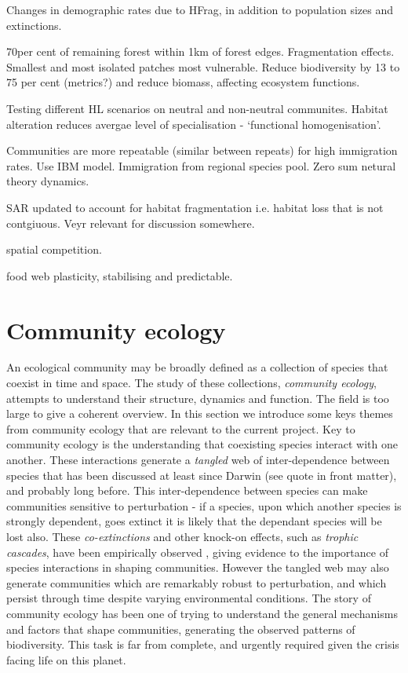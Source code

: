 \cite{korfanta2012long} Changes in demographic rates due to HFrag, in addition to population sizes and extinctions.

\cite{haddad2015habitat} 70per cent of remaining forest within 1km of forest edges. Fragmentation effects. Smallest and most isolated patches most vulnerable. Reduce biodiversity by 13 to 75 per cent (metrics?) and reduce biomass, affecting ecosystem functions. 

\cite{teyssedre2014contrasting} Testing different HL scenarios on neutral and non-neutral communites. Habitat alteration reduces avergae level of specialisation - `functional homogenisation'.

\cite{ai2012immigration} Communities are more repeatable (similar between repeats) for high immigration rates. Use IBM model. Immigration from regional species pool. Zero sum netural theory dynamics. 

\cite{hanski2013species} SAR updated to account for habitat fragmentation i.e. habitat loss that is not contgiuous. Veyr relevant for discussion somewhere.

\cite{freckleton2009measuring} spatial competition.

\cite{eveleigh2007fluctuations} food web plasticity, stabilising and predictable.
  
  
\section{Community ecology}
\label{sec:intro_community_ecology}

An ecological community may be broadly defined as a collection of species that coexist in time and space. The study of these collections, \emph{community ecology}, attempts to understand their structure, dynamics and function. The field is too large to give a coherent overview. In this section we introduce some keys themes from community ecology that are relevant to the current project. Key to community ecology is the understanding that coexisting species interact with one another. These interactions generate a \emph{tangled} web of inter-dependence between species that has been discussed at least since Darwin \cite{darwin2009origin} (see quote in front matter), and probably long before. This inter-dependence between species can make communities sensitive to perturbation - if a species, upon which another species is strongly dependent, goes extinct it is likely that the dependant species will be lost also. These \emph{co-extinctions} and other knock-on effects, such as \emph{trophic cascades}, have been empirically observed \cite{knight2005trophic,ripple2012trophic}, giving evidence to the importance of species interactions in shaping communities.   However the tangled web may also generate communities which are remarkably robust to perturbation, and which persist through time despite varying environmental conditions. The story of community ecology has been one of trying to understand the general mechanisms and factors that shape communities, generating the observed patterns of biodiversity. This task is far from complete, and urgently required given the crisis facing life on this planet.

